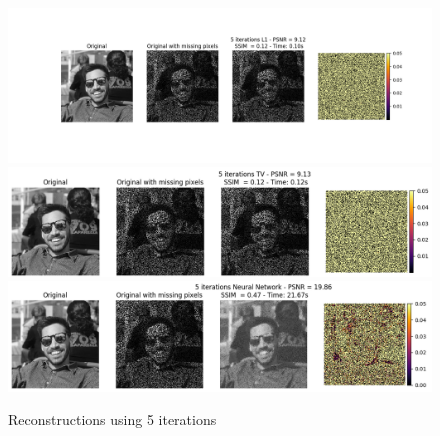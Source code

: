 \documentclass{article}
\begin{document}
\begin{enumerate}[label=2.\arabic*]
    \begin{figure}[ht]
        \centering
        \includegraphics[trim={3.5cm 2cm 3cm 2cm},clip,width=\textwidth]{img/l1_5.png}
        \includegraphics[trim={3.5cm 2cm 3cm 2cm},clip,width=\textwidth]{img/tv_5.png}
        \includegraphics[trim={3.5cm 2cm 3cm 2cm},clip,width=\textwidth]{img/nn_5.png}
        \caption{Reconstructions using 5 iterations}
        \label{fig:5}
    \end{figure}
\end{enumerate}
\end{document}

